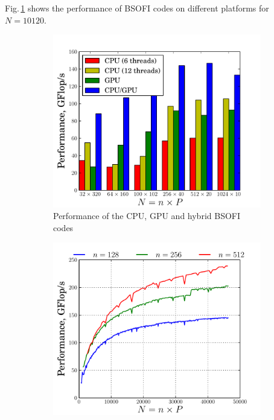 \documentclass{llncs}
\begin{document}
Fig.\,\ref{fig:compare_BSOFTRI+BSOI} shows the performance of 
BSOFI codes on different platforms for $N=10120$.
\begin{figure}[t]%
  \centering

  \begin{subfigure}[t]{0.49\linewidth}
    \includegraphics[width=\textwidth]{./figs/pdf/BSOFI_BSOI_12}
    \caption{Performance of the CPU, GPU and hybrid BSOFI codes\label{fig:compare_BSOFTRI+BSOI}}
  \end{subfigure}
  \begin{subfigure}[t]{0.49\linewidth}
    \includegraphics[width=\textwidth]{./figs/pdf/BSOFTRI_BSOI}

\end{subfigure}
\end{figure}
\end{document}

